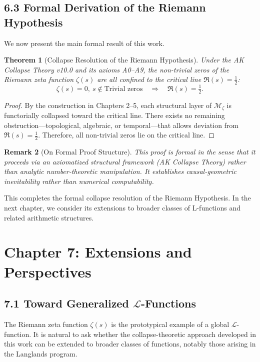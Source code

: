 \documentclass[11pt]{article}
\newtheorem{theorem}{Theorem}[section]
\newtheorem{remark}[theorem]{Remark}
\begin{document}
\subsection{6.3 Formal Derivation of the Riemann Hypothesis}

We now present the main formal result of this work.

\begin{theorem}[Collapse Resolution of the Riemann Hypothesis]
Under the AK Collapse Theory v10.0 and its axioms A0–A9,  
the non-trivial zeros of the Riemann zeta function $\zeta(s)$ are all confined to the critical line $\Re(s) = \tfrac{1}{2}$:
\[
\zeta(s) = 0,\ s \notin \text{Trivial zeros} \quad \Rightarrow \quad \Re(s) = \tfrac{1}{2}.
\]
\end{theorem}

\begin{proof}
By the construction in Chapters 2–5, each structural layer of $\mathcal{M}_\zeta$ is functorially collapsed toward the critical line.  
There exists no remaining obstruction—topological, algebraic, or temporal—that allows deviation from $\Re(s) = \tfrac{1}{2}$.  
Therefore, all non-trivial zeros lie on the critical line.
\end{proof}

\begin{remark}[On Formal Proof Structure]
This proof is formal in the sense that it proceeds via an axiomatized structural framework (AK Collapse Theory)  
rather than analytic number-theoretic manipulation.  
It establishes causal-geometric inevitability rather than numerical computability.
\end{remark}

This completes the formal collapse resolution of the Riemann Hypothesis.  
In the next chapter, we consider its extensions to broader classes of L-functions and related arithmetic structures.



\section{Chapter 7: Extensions and Perspectives}

\subsection{7.1 Toward Generalized $\mathcal{L}$-Functions}

The Riemann zeta function $\zeta(s)$ is the prototypical example of a global $\mathcal{L}$-function.  
It is natural to ask whether the collapse-theoretic approach developed in this work can be extended to broader classes of functions,  
notably those arising in the Langlands program.
\end{document}
